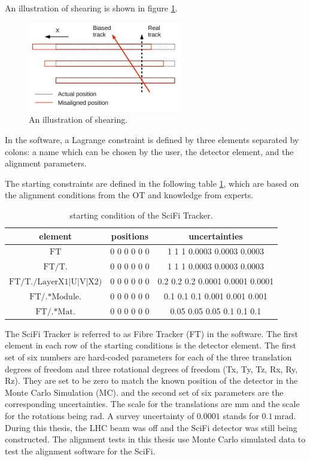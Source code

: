 An illustration of shearing is shown in figure \ref{fig:shear}.

\begin{figure}
    \centering
    \includegraphics[width=0.6\textwidth]{plots/shearing.png}
    \caption{An illustration of shearing.}
    \label{fig:shear}
\end{figure}

In the software, a Lagrange constraint is defined by three elements separated by colons: a name which can be chosen by the user, the detector element, and the alignment parameters.

The starting constraints are defined in the following table \ref{tab:cond}, which are based on the alignment conditions from the OT and knowledge from experts.
\begin{table}[!ht]
    \centering
    \begin{tabular}{c | c | c}
        \toprule
            element & positions & uncertainties \\
        \midrule
            $\text{FT}$ & 0 0 0 0 0 0 & 1 1 1 0.0003 0.0003 0.0003 \\
            $\text{FT/T.}$ & 0 0 0 0 0 0 & 1 1 1 0.0003 0.0003 0.0003 \\
            $\text{FT/T./LayerX1$\vert$U$\vert$V$\vert$X2)}$ & 0 0 0 0 0 0 & 0.2 0.2 0.2 0.0001 0.0001 0.0001 \\
            $\text{FT/.*Module.}$ & 0 0 0 0 0 0 & 0.1 0.1 0.1 0.001 0.001 0.001 \\
            $\text{FT/.*Mat.}$ & 0 0 0 0 0 0 & 0.05 0.05 0.05 0.1 0.1 0.1 \\
        \bottomrule
    \end{tabular}
    \caption{starting condition of the SciFi Tracker.}
    \label{tab:cond}
\end{table}

The SciFi Tracker is referred to as Fibre Tracker (FT) in the software.
The first element in each row of the starting conditions is the detector element.
The first set of six numbers are hard-coded parameters for each of the three translation degrees of freedom and three rotational degrees of freedom (Tx, Ty, Tz, Rx, Ry, Rz). They are set to be zero to match the known position of the detector in the Monte Carlo Simulation (MC).
and the second set of six parameters are the corresponding uncertainties.
The scale for the translations are $\si{\milli\metre}$ and the scale for the rotations being $\si{\radian}$. A survey uncertainty of $\num{0.0001}$ stands for $\SI{0.1}{\milli\radian}$.
During this thesis, the LHC beam was off and the SciFi detector was still being constructed. The alignment tests in this thesis use Monte Carlo simulated data to test the alignment software for the SciFi.

